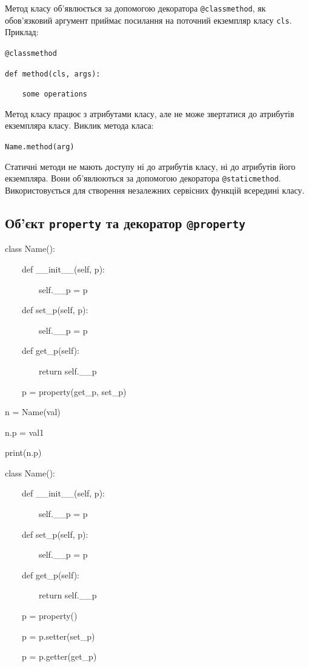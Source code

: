 \begin{frame}
Метод класу об'явлюється за допомогою декоратора \texttt{@classmethod}, як обов'язковий аргумент приймає посилання на поточний екземпляр класу \texttt{cls}. Приклад:

\texttt{@classmethod}

\texttt{def method(cls, args):}

\texttt{~~~~some operations}

Метод класу працює з атрибутами класу, але не може звертатися до атрибутів екземпляра класу. Виклик метода класа:

\texttt{Name.method(arg)}
\end{frame}

\begin{frame}
Статичні методи не мають доступу ні до атрибутів класу, ні до атрибутів його екземпляра. Вони об'явлюються за допомогою декоратора \texttt{@staticmethod}. Використовується для створення незалежних сервісних функцій всередині класу.  
\end{frame}

\subsection{Об'єкт \texttt{property} та декоратор \texttt{@property}} 
\begin{frame}
class Name():

~~~~def \_\_init\_\_(self, p):

~~~~~~~~self.\_\_p = p

~~~~def set\_p(self, p):

~~~~~~~~self.\_\_p = p

~~~~def get\_p(self):

~~~~~~~~return self.\_\_p

~~~~p = property(get\_p, set\_p)

n = Name(val)

n.p = val1

print(n.p)
\end{frame}

\begin{frame}
class Name():

~~~~def \_\_init\_\_(self, p):

~~~~~~~~self.\_\_p = p

~~~~def set\_p(self, p):

~~~~~~~~self.\_\_p = p

~~~~def get\_p(self):

~~~~~~~~return self.\_\_p

~~~~p = property()

~~~~p = p.setter(set\_p)

~~~~p = p.getter(get\_p)

\end{frame}

